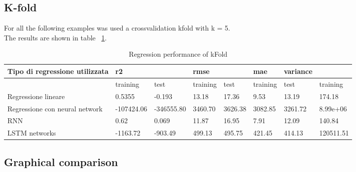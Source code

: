 \subsection{K-fold}
For all the following examples was used a crossvalidation kfold with k = 5.
\\The results are shown in table ~\ref{tab:table}.
\begin{table}
    \centering
    \begin{tabular}{|l|l|l|l|l|l|l|l|}
    \hline
        Tipo di regressione utilizzata & r2 & & rmse &&  mae & variance  & \\ \hline
         & training & test & training & test & training & test & training \\ \hline
        Regressione lineare & 0.5355 & -0.193 & 13.18 & 17.36 & 9.53 & 13.19 & 174.18 \\ \hline
        Regressione con neural network & -107424.06 & -346555.80 & 3460.70 & 3626.38 & 3082.85 & 3261.72 & 8.99e+06 \\ \hline
        RNN & 0.62 & 0.069 & 11.87 & 16.95 & 7.91 & 12.09 & 140.84 \\ \hline
        LSTM networks & -1163.72 & -903.49 & 499.13 & 495.75 & 421.45 & 414.13 & 120511.51 \\ \hline
    \end{tabular}
    \caption{Regression performance of kFold }
    \label{tab:table}
\end{table}



\subsection{Graphical comparison}
\subsection{}